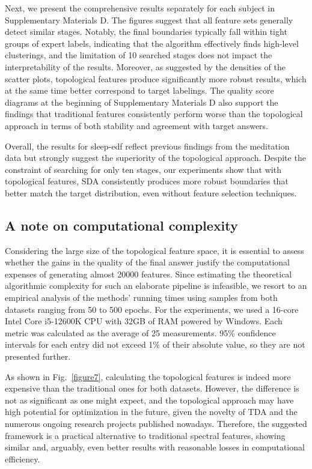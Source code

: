 \documentclass[journal,twoside,web]{ieeecolor2}
\begin{document}
Next, we present the comprehensive results separately for each subject in Supplementary Materials D. The figures suggest that all feature sets generally detect similar stages. Notably, the final boundaries typically fall within tight groups of expert labels, indicating that the algorithm effectively finds high-level clusterings, and the limitation of 10 searched stages does not impact the interpretability of the results. Moreover, as suggested by the densities of the scatter plots, topological features produce significantly more robust results, which at the same time better correspond to target labelings. The quality score diagrams at the beginning of Supplementary Materials D also support the findings that traditional features consistently perform worse than the topological approach in terms of both stability and agreement with target answers.

Overall, the results for sleep-edf reflect previous findings from the meditation data but strongly suggest the superiority of the topological approach. Despite the constraint of searching for only ten stages, our experiments show that with topological features, SDA consistently produces more robust boundaries that better match the target distribution, even without feature selection techniques.\@

\subsection{A note on computational complexity}

Considering the large size of the topological feature space, it is essential to assess whether the gains in the quality of the final answer justify the computational expenses of generating almost 20000 features. Since estimating the theoretical algorithmic complexity for such an elaborate pipeline is infeasible, we resort to an empirical analysis of the methods' running times using samples from both datasets ranging from 50 to 500 epochs. For the experiments, we used a 16-core Intel Core i5-12600K CPU with 32GB of RAM powered by Windows. Each metric was calculated as the average of 25 measurements. 95\% confidence intervals for each entry did not exceed 1\% of their absolute value, so they are not presented further.

As shown in Fig.~\ref{figure7}, calculating the topological features is indeed more expensive than the traditional ones for both datasets. However, the difference is not as significant as one might expect, and the topological approach may have high potential for optimization in the future, given the novelty of TDA and the numerous ongoing research projects published nowadays. Therefore, the suggested framework is a practical alternative to traditional spectral features, showing similar and, arguably, even better results with reasonable losses in computational efficiency.
\end{document}
